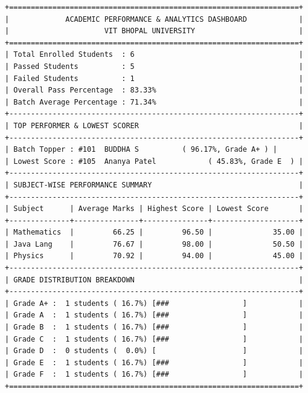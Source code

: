 \documentclass[12pt,a4paper]{report}
\begin{document}
\begin{lstlisting}[language={}]
+===================================================================+
|             ACADEMIC PERFORMANCE & ANALYTICS DASHBOARD            |
|                      VIT BHOPAL UNIVERSITY                        |
+===================================================================+
| Total Enrolled Students  : 6                                      |
| Passed Students          : 5                                      |
| Failed Students          : 1                                      |
| Overall Pass Percentage  : 83.33%                                 |
| Batch Average Percentage : 71.34%                                 |
+-------------------------------------------------------------------+
| TOP PERFORMER & LOWEST SCORER                                     |
+-------------------------------------------------------------------+
| Batch Topper : #101  BUDDHA S          ( 96.17%, Grade A+ ) |
| Lowest Score : #105  Ananya Patel            ( 45.83%, Grade E  ) |
+-------------------------------------------------------------------+
| SUBJECT-WISE PERFORMANCE SUMMARY                                  |
+-------------------------------------------------------------------+
| Subject      | Average Marks | Highest Score | Lowest Score       |
+--------------+---------------+---------------+--------------------+
| Mathematics  |         66.25 |         96.50 |              35.00 |
| Java Lang    |         76.67 |         98.00 |              50.50 |
| Physics      |         70.92 |         94.00 |              45.00 |
+-------------------------------------------------------------------+
| GRADE DISTRIBUTION BREAKDOWN                                      |
+-------------------------------------------------------------------+
| Grade A+ :  1 students ( 16.7%) [###                 ]            |
| Grade A  :  1 students ( 16.7%) [###                 ]            |
| Grade B  :  1 students ( 16.7%) [###                 ]            |
| Grade C  :  1 students ( 16.7%) [###                 ]            |
| Grade D  :  0 students (  0.0%) [                    ]            |
| Grade E  :  1 students ( 16.7%) [###                 ]            |
| Grade F  :  1 students ( 16.7%) [###                 ]            |
+===================================================================+
\end{lstlisting}

\end{document}
